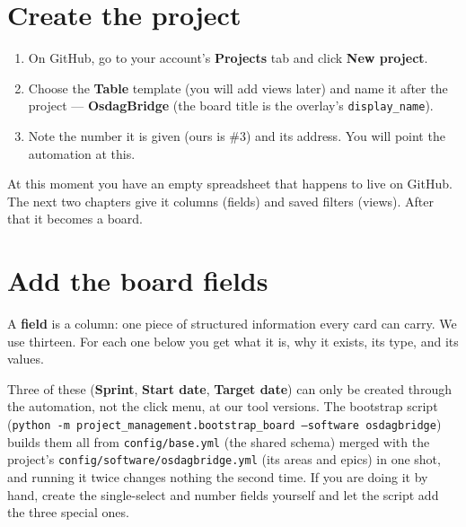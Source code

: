 \documentclass[11pt,a4paper]{report}
\newcommand{\code}[1]{\texttt{#1}}
\newcommand{\fieldname}[1]{\textbf{#1}}
\begin{document}
\chapter{Create the project}

\begin{enumerate}[leftmargin=1.6em,itemsep=3pt]
  \item On GitHub, go to your account's \textbf{Projects} tab and click
        \textbf{New project}.
  \item Choose the \textbf{Table} template (you will add views later) and name it
        after the project --- \textbf{OsdagBridge} (the board title is the
        overlay's \code{display\_name}).
  \item Note the number it is given (ours is \#3) and its address. You will point
        the automation at this.
\end{enumerate}

\begin{plainenglish}
At this moment you have an empty spreadsheet that happens to live on GitHub. The
next two chapters give it columns (fields) and saved filters (views). After that it
becomes a board.
\end{plainenglish}

\chapter{Add the board fields}

A \textbf{field} is a column: one piece of structured information every card can
carry. We use thirteen. For each one below you get what it is, why it exists, its
type, and its values.

\begin{notebox}
Three of these (\fieldname{Sprint}, \fieldname{Start date}, \fieldname{Target
date}) can only be created through the automation, not the click menu, at our
tool versions. The bootstrap script (\code{python -m project\_management.bootstrap\_board
--software osdagbridge}) builds them all from \code{config/base.yml} (the shared
schema) merged with the project's \code{config/software/osdagbridge.yml} (its
areas and epics) in one shot, and running it twice changes nothing the second
time. If you are doing it by hand, create the single-select and number fields
yourself and let the script add the three special ones.
\end{notebox}
\end{document}
